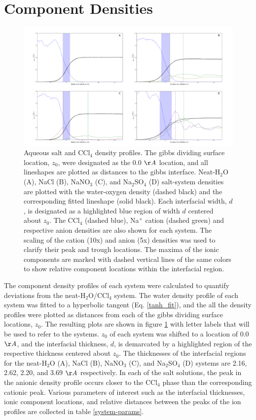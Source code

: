 \section{Component Densities}


\begin{figure}[h!]
\begin{center}
	\includegraphics[scale=0.2]{images/densities.png}
	\caption{Aqueous salt and CCl$_4$ density profiles. The gibbs dividing surface location, $z_0$, were designated as the 0.0 $\AA$ location, and all lineshapes are plotted as distances to the gibbs interface. Neat-H$_2$O (A), NaCl (B), NaNO$_3$ (C), and Na$_2$SO$_4$ (D) salt-system densities are plotted with the water-oxygen density (dashed black) and the corresponding fitted lineshape (solid black). Each interfacial width, $d$, is designated as a highlighted blue region of width $d$ centered about $z_0$. The CCl$_4$ (dashed blue), Na$^+$ cation (dashed green) and respective anion densities are also shown for each system. The scaling of the cation (10x) and anion (5x) densities was used to clarify their peak and trough locations. The maxima of the ionic components are marked with dashed vertical lines of the same colors to show relative component locations within the interfacial region.}
	\label{fig:density-plots}
\end{center}
\end{figure}

The component density profiles of each system were calculated to quantify deviations from the neat-H$_2$O/CCl$_4$ system. The water density profile of each system was fitted to a hyperbolic tangent (Eq. \ref{tanh_fit}), and the all the density profiles were plotted as distances from each of the gibbs dividing surface locations, $z_0$. The resulting plots are shown in figure \ref{fig:density-plots} with letter labels that will be used to refer to the systems. $z_0$ of each system was shifted to a location of 0.0 $\AA$, and the interfacial thickness, $d$, is demarcated by a highlighted region of the respective thickness centered about $z_0$. The thicknesses of the interfacial regions for the neat-H$_2$O (A), NaCl (B), NaNO$_3$ (C), and Na$_2$SO$_4$ (D) systems are 2.16, 2.62, 2.20, and 3.69 $\AA$ respectively. In each of the salt solutions, the peak in the anionic density profile occurs closer to the CCl$_4$ phase than the corresponding cationic peak. Various parameters of interest such as the interfacial thicknesses, ionic component locations, and relative distances between the peaks of the ion profiles are collected in table \ref{system-params}.

